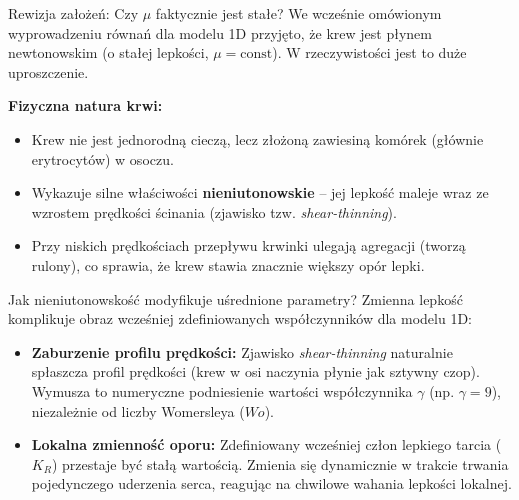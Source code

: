 \documentclass[aspectratio=169]{beamer}
\begin{document}
\begin{frame}{Rewizja założeń: Czy $\mu$ faktycznie jest stałe?}
    We wcześnie omówionym wyprowadzeniu równań dla modelu 1D przyjęto, że krew jest płynem newtonowskim (o stałej lepkości, $\mu = \text{const}$). W rzeczywistości jest to duże uproszczenie.

    \vspace{0.3cm}
    \textbf{Fizyczna natura krwi:}
    \begin{itemize}
        \item Krew nie jest jednorodną cieczą, lecz złożoną zawiesiną komórek (głównie erytrocytów) w osoczu.
        \item Wykazuje silne właściwości \textbf{nieniutonowskie} – jej lepkość maleje wraz ze wzrostem prędkości ścinania (zjawisko tzw. \textit{shear-thinning}).
        \item Przy niskich prędkościach przepływu krwinki ulegają agregacji (tworzą rulony), co sprawia, że krew stawia znacznie większy opór lepki.
    \end{itemize}
\end{frame}

\begin{frame}{Jak nieniutonowskość modyfikuje uśrednione parametry?}
    Zmienna lepkość komplikuje obraz wcześniej zdefiniowanych współczynników dla modelu 1D:

    \vspace{0.3cm}
    \begin{itemize}
        \item \textbf{Zaburzenie profilu prędkości:} Zjawisko \textit{shear-thinning} naturalnie spłaszcza profil prędkości (krew w osi naczynia płynie jak sztywny czop). Wymusza to numeryczne podniesienie wartości współczynnika $\gamma$ (np. $\gamma=9$), niezależnie od liczby Womersleya ($Wo$).
        \item \textbf{Lokalna zmienność oporu:} Zdefiniowany wcześniej człon lepkiego tarcia ($K_R$) przestaje być stałą wartością. Zmienia się dynamicznie w trakcie trwania pojedynczego uderzenia serca, reagując na chwilowe wahania lepkości lokalnej.
    \end{itemize}
\end{frame}
\end{document}
